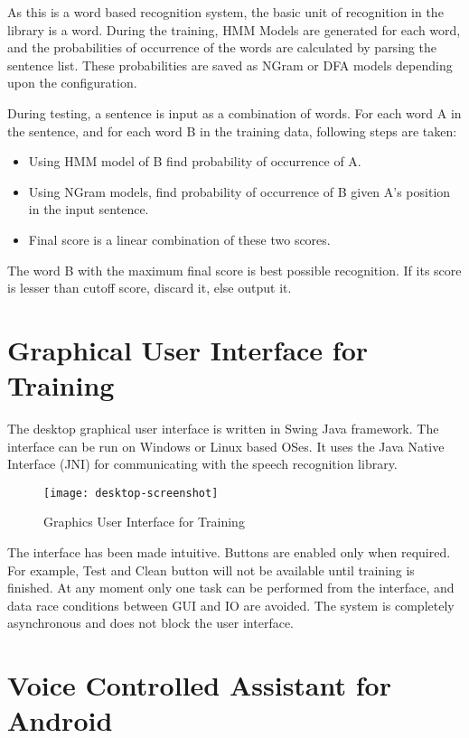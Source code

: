 As this is a word based recognition system, the basic unit of recognition in the library is a word. During the training, HMM Models are generated for each word, and the probabilities of occurrence of the words are calculated by parsing the sentence list. These probabilities are saved as NGram or DFA models depending upon the configuration.

During testing, a sentence is input as a combination of words.
For each word A in the sentence, and for each word B in the training data, following steps are taken:
\begin{itemize}
    \item Using HMM model of B find probability of occurrence of A.
    \item Using NGram models, find probability of occurrence of B given A's position in the input sentence.
    \item Final score is a linear combination of these two scores.
\end{itemize}
The word B with the maximum final score is best possible recognition. If its score is lesser than cutoff score, discard it, else output it.

\section{Graphical User Interface for Training}

The desktop graphical user interface is written in Swing Java framework. The interface can be run on Windows or Linux based OSes. It uses the Java Native Interface (JNI) for communicating with the speech recognition library.

\begin{figure}[h!]
    \centering
    \texttt{[image: desktop-screenshot]}
    \label{fig:desktop-screenshot}
    \caption{Graphics User Interface for Training}
\end{figure}

\newpage

The interface has been made intuitive. Buttons are enabled only when required. For example, Test and Clean button will not be available until training is finished. At any moment only one task can be performed from the interface, and data race conditions between GUI and IO are avoided. The system is completely asynchronous and does not block the user interface.

\section{Voice Controlled Assistant for Android}

